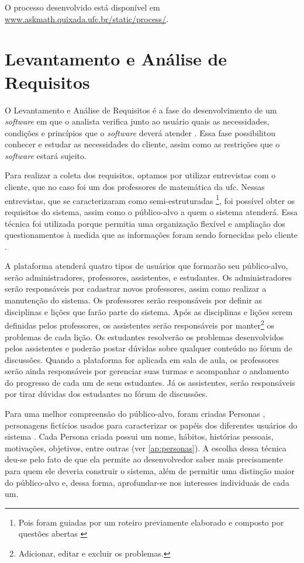 O processo desenvolvido est\'a dispon\'ivel em \url{www.askmath.quixada.ufc.br/static/process/}. 

\section{Levantamento e Análise de Requisitos}


O Levantamento e An\'alise de Requisitos é a fase do desenvolvimento de um \textit{software} em que o analista verifica junto ao usuário 
quais as necessidades, condições e princípios que o \textit{software} deverá atender \cite{matuda2013mapas}. Essa fase possibilitou 
conhecer e estudar as necessidades do cliente, assim como as restrições que o \textit{software} estará sujeito.

Para realizar a coleta dos requisitos, optamos por utilizar entrevistas com o cliente, que no caso foi um dos professores de matemática da \gls{ufc}. Nessas entrevistas, que se caracterizaram como semi-estruturadas \footnote{Pois foram guiadas por um 
roteiro previamente elaborado e composto por questões abertas \cite{belei2008uso}}, foi possível obter os requisitos do sistema, assim como 
o público-alvo a quem o sistema atenderá. Essa técnica foi utilizada porque permitia uma organização flexível e ampliação dos 
questionamentos à medida que as informações foram sendo fornecidas pelo cliente \cite{fujisawa2000utilizaccao}.

A plataforma atender\'a quatro tipos de usu\'arios que formarão seu p\'ublico-alvo, ser\~ao administradores, professores, assistentes, e estudantes. Os administradores ser\~ao respons\'aveis por 
cadastrar novos professores, assim como realizar a manuten\c{c}\~ao do sistema. Os professores ser\~ao responsáveis por definir 
as disciplinas e li\c{c}\~oes que far\~ao parte do sistema. 
Ap\'os as disciplinas e li\c{c}\~oes serem definidas pelos professores, os assistentes ser\~ao respons\'aveis por manter\footnote{Adicionar, editar e excluir os problemas.} os problemas de cada 
li\c{c}\~ao. Os estudantes resolver\~ao os problemas desenvolvidos pelos assistentes e poder\~ao postar d\'uvidas sobre qualquer conte\'udo 
no f\'orum de discuss\~oes. Quando a plataforma for aplicada em sala de aula, os professores ser\~ao ainda respons\'aveis por gerenciar suas 
turmas e acompanhar o andamento do progresso de cada um de seus estudantes. J\'a os assistentes, ser\~ao responsáveis por tirar d\'uvidas 
dos estudantes no f\'orum de discuss\~oes.

Para uma melhor compreensão do público-alvo, foram criadas Personas \cite{pruitt2003personas}, personagens fictícios usados para 
caracterizar os papéis dos diferentes usuários do sistema \cite{guerra2010colaboraccao}. Cada Persona criada possui um nome, hábitos, 
histórias pessoais, motivações, objetivos, entre outras (ver \autoref{ap:personas}). A escolha dessa técnica deu-se pelo fato de que ela 
permite ao desenvolvedor saber mais precisamente para 
quem ele deveria construir o sistema, além de permitir uma distinção maior do público-alvo e, dessa forma, aprofundar-se nos interesses individuais de cada um.

